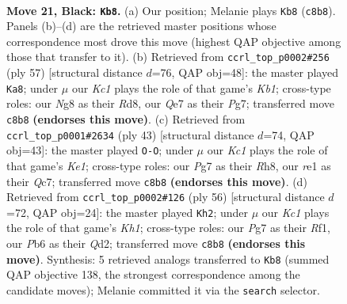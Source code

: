 \documentclass[11pt]{article}
\begin{document}
\clearpage

\begin{figure}[p]\centering
\begin{subfigure}{0.46\textwidth}\centering
\resizebox{\linewidth}{!}{%
\newchessgame
\chessboard[
  setfen={2k3nr/p1p1qppp/1p2b3/2pB4/8/2P2P2/1P1Q2PP/2K1R3 b - - 5 21},
  showmover=false,
  pgfstyle=straightmove, color=movearrow, markmove={c8-b8}
]}
\caption{}
\end{subfigure}\hfill
\begin{subfigure}{0.46\textwidth}\centering
\resizebox{\linewidth}{!}{%
\newchessgame
\chessboard[
  setfen={1k1r4/1p4p1/p1q2p2/3pb3/3B2P1/P2R4/1PPQ1P2/1K6 b - - 2 29},
  showmover=false,
  pgfstyle=straightmove, color=movearrow, markmove={b8-a8}
]}
\caption{}
\end{subfigure}
\\[4pt]
\begin{subfigure}{0.46\textwidth}\centering
\resizebox{\linewidth}{!}{%
\newchessgame
\chessboard[
  setfen={4k2r/2q2ppp/4p3/p1p1P3/1b6/1PB3P1/2Q1PPKP/R7 b k - 0 22},
  showmover=false,
  pgfstyle=straightmove, color=movearrow, markmove={e8-g8}
]}
\caption{}
\end{subfigure}\hfill
\begin{subfigure}{0.46\textwidth}\centering
\resizebox{\linewidth}{!}{%
\newchessgame
\chessboard[
  setfen={8/r5kp/2b3p1/1pq1p3/2p1P3/2P2B1P/1P1Q2P1/5R1K w - - 3 29},
  showmover=false,
  pgfstyle=straightmove, color=movearrow, markmove={h1-h2}
]}
\caption{}
\end{subfigure}
\caption{\textbf{Move 21, Black: \texttt{Kb8}.} (a) Our position; Melanie plays \texttt{Kb8} (\texttt{c8b8}). Panels (b)--(d) are the retrieved master positions whose correspondence most drove this move (highest QAP objective among those that transfer to it). (b) Retrieved from \texttt{ccrl\_top\_p0002\#256} (ply 57) [structural distance $d$=76, QAP obj=48]: the master played \texttt{Ka8}; under $\mu$ our \emph{Kc1} plays the role of that game's \emph{Kb1}; cross-type roles: our \emph{N}g8 as their \emph{R}d8, our \emph{Q}e7 as their \emph{P}g7; transferred move \texttt{c8b8} \textbf{(endorses this move)}. (c) Retrieved from \texttt{ccrl\_top\_p0001\#2634} (ply 43) [structural distance $d$=74, QAP obj=43]: the master played \texttt{O-O}; under $\mu$ our \emph{Kc1} plays the role of that game's \emph{Ke1}; cross-type roles: our \emph{P}g7 as their \emph{R}h8, our \emph{r}e1 as their \emph{Q}c7; transferred move \texttt{c8b8} \textbf{(endorses this move)}. (d) Retrieved from \texttt{ccrl\_top\_p0002\#126} (ply 56) [structural distance $d$=72, QAP obj=24]: the master played \texttt{Kh2}; under $\mu$ our \emph{Kc1} plays the role of that game's \emph{Kh1}; cross-type roles: our \emph{P}g7 as their \emph{R}f1, our \emph{P}b6 as their \emph{Q}d2; transferred move \texttt{c8b8} \textbf{(endorses this move)}. Synthesis: 5 retrieved analogs transferred to \texttt{Kb8} (summed QAP objective 138, the strongest correspondence among the candidate moves); Melanie committed it via the \texttt{search} selector.}
\label{fig:thought-m41}
\end{figure}
\end{document}
